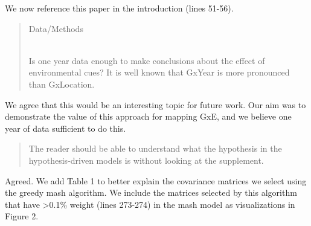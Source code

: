 \documentclass[
  letterpaper,
  DIV=11,
  numbers=noendperiod]{scrartcl}
\begin{document}
We now reference this paper in the introduction (lines 51-56).

\begin{quote}
\begin{tcolorbox}[enhanced jigsaw, rightrule=.15mm, colframe=quarto-callout-warning-color-frame, leftrule=.75mm, arc=.35mm, colback=white, opacityback=0, left=2mm, breakable, toprule=.15mm, bottomrule=.15mm]

Data/Methods\\
\strut \\
Is one year data enough to make conclusions about the effect of
environmental cues? It is well known that GxYear is more pronounced than
GxLocation.

\end{tcolorbox}
\end{quote}

We agree that this would be an interesting topic for future work. Our
aim was to demonstrate the value of this approach for mapping GxE, and
we believe one year of data sufficient to do this.

\begin{quote}
\begin{tcolorbox}[enhanced jigsaw, rightrule=.15mm, colframe=quarto-callout-warning-color-frame, leftrule=.75mm, arc=.35mm, colback=white, opacityback=0, left=2mm, breakable, toprule=.15mm, bottomrule=.15mm]

The reader should be able to understand what the hypothesis in the
hypothesis-driven models is without looking at the supplement.

\end{tcolorbox}
\end{quote}

Agreed. We add Table 1 to better explain the covariance matrices we
select using the greedy mash algorithm. We include the matrices selected
by this algorithm that have \textgreater0.1\% weight (lines 273-274) in
the mash model as visualizations in Figure 2.
\end{document}
